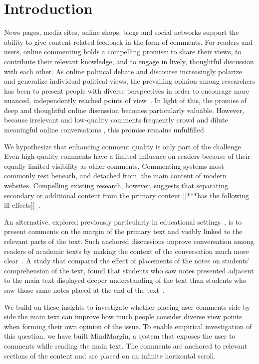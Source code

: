 \section{Introduction}

News pages, media sites, online shops, blogs and social networks support the ability to give content-related feedback in the form of comments. For readers and users, online commenting holds a compelling promise: to share their views, to contribute their relevant knowledge, and to engage in lively, thoughtful discussion with each other. As online political debate and discourse increasingly polarize and generalize individual political views, the prevailing opinion among researchers has been to present people with diverse perspectives in order to encourage more nuanced, independently reached points of view~\cite{ConsiderIt,Politics,NewsCube}. In light of this, the promise of deep and thoughtful online discussion becomes particularly valuable. However, because irrelevant and low-quality comments frequently crowd and dilute meaningful online conversations \cite{CommentQuality, FlamingCommunications}, this promise remains unfulfilled.

We hypothesize that enhancing comment quality is only part of the challenge. Even high-quality comments have a limited influence on readers because of their equally limited visibility as other comments. Commenting systems most commonly rest beneath, and detached from, the main content of modern websites. Compelling existing research, however, suggests that separating secondary or additional content from the primary content [[***has the following ill effects]]~\cite{Brush,Guzdial,van,AnnotationsStudents,NewsInterfaces,FluidDocs,NB}.

An alternative, explored previously particularly in educational settings~\cite{Brush,Guzdial,van,AnnotationsStudents}, is to present comments on the margin of the primary text and visibly linked to the relevant parts of the text.  Such anchored discussions improve conversation among readers of academic texts by making the context of the conversation much more clear~\cite{Brush,Guzdial,van}.  A study that compared the effect of placements of the notes on students' comprehension of the text, found that students who saw notes presented adjacent to the main text displayed deeper understanding of the text than students who saw those same notes placed at the end of the text~\cite{AnnotationsStudents}.

We build on these insights to investigate whether placing user comments side-by-side the main text can improve how much people consider diverse view points when forming their own opinion of the issue.  To enable empirical investigation of this question, we have built MindMargin, a system that exposes the user to comments while reading the main text. The comments are anchored to relevant sections of the content and are placed on an infinite horizontal scroll.

